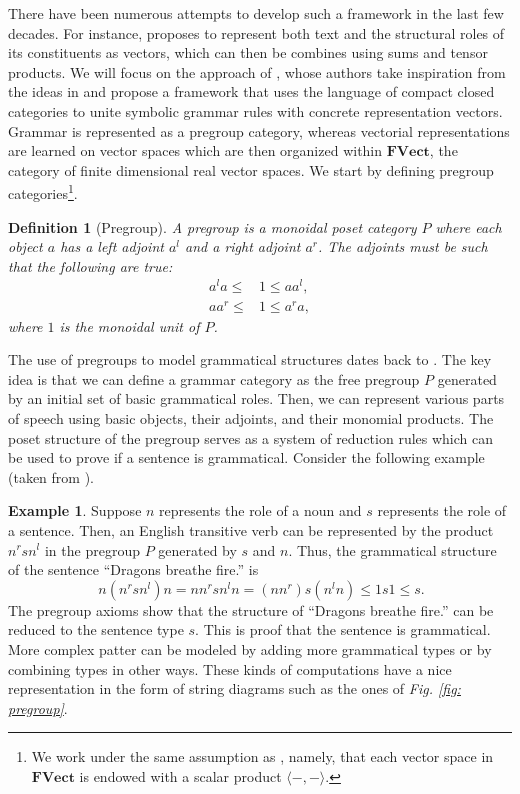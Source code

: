 \documentclass[11pt,a4paper,openright,twoside]{report}
\newcounter{mycounter}
\theoremstyle{plain}
\newtheorem{definition}[mycounter]{Definition}
\theoremstyle{definition}
\newtheorem{example}[mycounter]{Example}
\newcommand\dblquote[1]{\textquotedblleft #1\textquotedblright}
\begin{document}
There have been numerous attempts to develop such a framework in the last few decades. For instance, \cite{clark2007combining} proposes to represent both text and the structural roles of its constituents as vectors, which can then be combines using sums and tensor products. We will focus on the approach of \cite{coecke2010mathematical}, whose authors take inspiration from the ideas in \cite{clark2007combining} and propose a framework that uses the language of compact closed categories to unite symbolic grammar rules with concrete representation vectors. Grammar is represented as a pregroup category, whereas vectorial representations are learned on vector spaces which are then organized within $\mathbf{FVect}$, the category of finite dimensional real vector spaces. We start by defining pregroup categories\footnote{We work under the same assumption as \cite{coecke2010mathematical}, namely, that each vector space in $\mathbf{FVect}$ is endowed with a scalar product $\langle-,-\rangle$.}.

\begin{definition}[Pregroup]
  A pregroup is a monoidal poset category $P$ where each object $a$ has a left adjoint $a^l$ and a right adjoint $a^r$. The adjoints must be such that the following are true:
  \begin{align*}
    a^la \leq &1 \leq aa^l,\\
    aa^r \leq &1 \leq a^ra,
  \end{align*}
  where $1$ is the monoidal unit of $P$.
\end{definition}

The use of pregroups to model grammatical structures dates back to \cite{lambek1999type}. The key idea is that we can define a grammar category as the free pregroup $P$ generated by an initial set of basic grammatical roles. Then, we can represent various parts of speech using basic objects, their adjoints, and their monomial products. The poset structure of the pregroup serves as a system of reduction rules which can be used to prove if a sentence is grammatical. Consider the following example (taken from \cite{lewis2019compositionality}).


\begin{example}
  Suppose $n$ represents the role of a noun and $s$ represents the role of a sentence. Then, an English transitive verb can be represented by the product $n^rsn^l$ in the pregroup $P$ generated by $s$ and $n$. Thus, the grammatical structure of the sentence \dblquote{Dragons breathe fire.} is
  \begin{equation}\
    \label{eq: grammreduction}
    n(n^rsn^l)n = nn^rsn^ln = (nn^r)s(n^ln) \leq 1s1 \leq s.
  \end{equation}
  The pregroup axioms show that the structure of  \dblquote{Dragons breathe fire.} can be reduced to the sentence type $s$. This is proof that the sentence is grammatical. More complex patter can be modeled by adding more grammatical types or by combining types in other ways. These kinds of computations have a nice representation in the form of string diagrams such as the ones of \textit{Fig. \ref{fig: pregroup}}.
\end{example}
\end{document}
